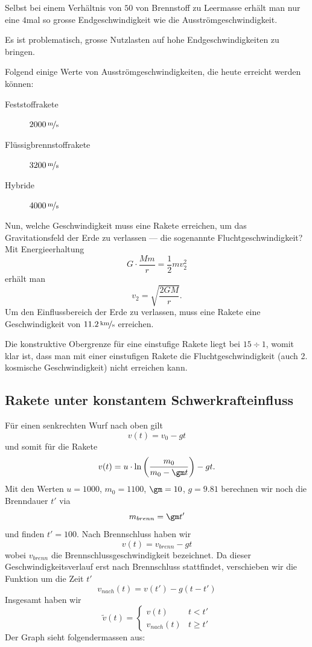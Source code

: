 \documentclass[%
11pt,%
twoside,%
titlepage,%
german,%
headsepline%
]{scrartcl}
\begin{document}
Selbst bei einem Verh\"altnis von $50$ von Brennstoff zu Leermasse erh\"alt man nur eine $4$mal so grosse Endgeschwindigkeit wie die Ausstr\"omgeschwindigkeit.

\begin{bem}
Es ist problematisch, grosse Nutzlasten auf hohe Endgeschwindigkeiten zu bringen.
\end{bem}

Folgend einige Werte von Ausstr\"omgeschwindigkeiten, die heute erreicht werden k\"onnen:
\begin{description}
\item[Feststoffrakete] $\unitfrac[2000]{m}{s}$
\item[Fl\"ussigbrennstoffrakete] $\unitfrac[3200]{m}{s}$
\item[Hybride] $\unitfrac[4000]{m}{s}$
\end{description}

Nun, welche Geschwindigkeit muss eine Rakete erreichen, um das Gravitationsfeld der Erde zu verlassen --- die sogenannte Fluchtgeschwindigkeit? Mit Energieerhaltung
$$G\cdot\frac{Mm}{r}=\frac{1}{2}mv_2^2$$
erh\"alt man
$$v_2=\sqrt{\frac{2GM}{r}}.$$
Um den Einflussbereich der Erde zu verlassen, muss eine Rakete eine Geschwindigkeit von $\unitfrac[11.2]{km}{s}$ erreichen.

\begin{bem}
Die konstruktive Obergrenze f\"ur eine einstufige Rakete liegt bei $15\div1$, womit klar ist, dass man mit einer einstufigen Rakete die Fluchtgeschwindigkeit (auch 2. kosmische Geschwindigkeit) nicht erreichen kann.
\end{bem}

\subsection{Rakete unter konstantem Schwerkrafteinfluss}

F\"ur einen senkrechten Wurf nach oben gilt
$$v(t)=v_0-gt$$
und somit f\"ur die Rakete
$$v(t)=u\cdot\ln\left(\frac{m_0}{m_0-\gm t}\right)-gt.$$
Mit den Werten $u=1000$, $m_0=1100$, $\gm=10$, $g=9.81$ berechnen wir noch die Brenndauer $t'$ via
$$m_{brenn}=\gm t'$$
und finden $t'=100$.
Nach Brennschluss haben wir
$$v(t)=v_{brenn}-gt$$
wobei $v_{brenn}$ die Brennschlussgeschwindigkeit bezeichnet. Da dieser Geschwindigkeitsverlauf erst nach Brennschluss stattfindet, verschieben wir die Funktion um die Zeit $t'$
$$v_{nach}(t)=v(t')-g(t-t')$$
Insgesamt haben wir
$$\tilde{v}(t)=
\begin{cases}
v(t)& t<t'\\
v_{nach}(t)& t\geq t'
\end{cases}
$$
Der Graph sieht folgendermassen aus:
\end{document}
